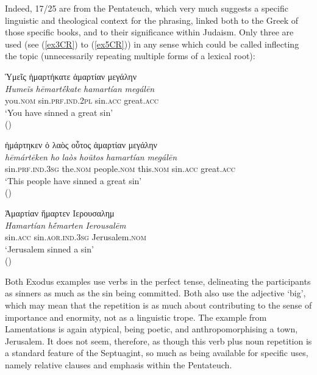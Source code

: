 \documentclass[output=paper,colorlinks,citecolor=brown]{langscibook}
\begin{document}
Indeed, 17/25 are from the Pentateuch, which very much suggests a
specific linguistic and theological context for the phrasing, linked
both to the Greek of those specific books, and to their significance
within Judaism. 
Only three are used (see (\ref{ex3CR}) to (\ref{ex5CR})) in any sense which could be called inflecting the topic (unnecessarily repeating multiple forms of a lexical root):


\ea\label{ex3CR} 
\glll Ὑμεῖς ἡμαρτήκατε ἁμαρτίαν μεγάλην\\
\textit{Humeĩs} \textit{hēmartḗkate} \textit{hamartían} \textit{megálēn}\\
    you.\textsc{nom} sin.\textsc{prf.ind.2pl} sin.\textsc{acc} great.\textsc{acc} \\

\glt `You have sinned a great sin' \\
\hspace*{\fill}()
\z

\ea\label{ex4CR}
\glll ἡμάρτηκεν ὁ λαὸς οὗτος ἁμαρτίαν μεγάλην\\
\textit{hēmártēken} \textit{ho} \textit{laòs} \textit{hoũtos} \textit{hamartían} \textit{megálēn} \\
    sin.\textsc{prf.ind.3sg} the.\textsc{nom} people.\textsc{nom} this.\textsc{nom} sin.\textsc{acc} great.\textsc{acc} \\

\glt `This people have sinned a great sin' \\
\hspace*{\fill}()
\z

\ea\label{ex5CR}  
\glll Ἁμαρτίαν ἥμαρτεν Ιερουσαλημ\\
\textit{Hamartían} \textit{hḗmarten} \textit{Ierousalēm}\\
    sin.\textsc{acc} sin.\textsc{aor.ind.3sg} Jerusalem.\textsc{nom}\\

\glt `Jerusalem sinned a sin' \\
\hspace*{\fill}()
\z



Both Exodus examples use verbs in the perfect tense, delineating the
participants as sinners as much as the sin being committed. 
Both also
use the adjective `big', which may mean that the repetition is as much
about contributing to the sense of importance and enormity, not as a
linguistic trope. 
The example from Lamentations is again atypical, being
poetic, and anthropomorphising a town, Jerusalem. 
It does not seem,
therefore, as though this verb plus noun repetition is a standard
feature of the Septuagint, so much as being available for specific uses,
namely relative clauses and emphasis within the Pentateuch.
\end{document}

